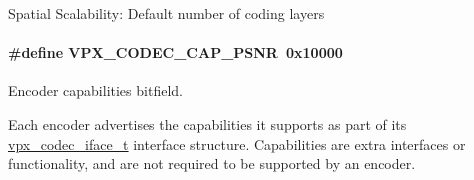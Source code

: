 Spatial Scalability\+: Default number of coding layers \hypertarget{group__encoder_ga398803f408d6f71aae730b5ee7793e1c}{
\paragraph[{V\+P\+X\+\_\+\+C\+O\+D\+E\+C\+\_\+\+C\+A\+P\+\_\+\+P\+S\+N\+R}]{\setlength{\rightskip}{0pt plus 5cm}\#define V\+P\+X\+\_\+\+C\+O\+D\+E\+C\+\_\+\+C\+A\+P\+\_\+\+P\+S\+N\+R~0x10000}}\label{group__encoder_ga398803f408d6f71aae730b5ee7793e1c}


Encoder capabilities bitfield. 

Each encoder advertises the capabilities it supports as part of its \hyperlink{group__codec_gae99c3b04f4a567a311211cce3ae6b83b}{vpx\+\_\+codec\+\_\+iface\+\_\+t} interface structure. Capabilities are extra interfaces or functionality, and are not required to be supported by an encoder.

